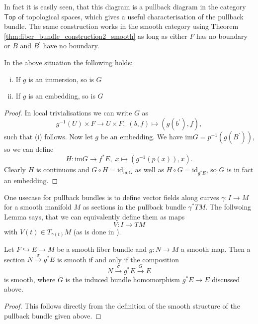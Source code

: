     In fact it is easily seen, that this diagram is a pullback diagram in the category $\mathsf{Top}$ of topological spaces, which gives a useful characterisation of the pullback bundle. The same construction works in the smooth category using Theorem \ref{thm:fiber_bundle_construction2_smooth} as long as either $F$ has no boundary or $B$ and $B^\prime$ have no boundary. 

    \needspace{3cm}
    \begin{lemma}
        \label{fiber_bundles:lem:pullback_of_bundle_under_embedding}
        In the above situation the following holds:
        \begin{enumerate}[(i)]
            \item If $g$ is an immersion, so is $G$
            \item If $g$ is an embedding, so is $G$
        \end{enumerate}
    \end{lemma}
   \begin{proof}
    In local trivialisations we can write $G$ as
    \[
    g^{-1}(U) \times F \to U \times F, \; (b,f) \mapsto (g(b^\prime),f),
    \]
    such that (i) follows. Now let $g$ be an embedding. We have $\mathrm{im} G = p^{-1}(g(B^\prime))$, so we can define 
    \[
    H \colon \mathrm{im} G \to f^*E, \; x \mapsto (g^{-1}(p(x)),x).
    \]
    Clearly $H$ is continuous and $G \circ H = \mathrm{id}_{\mathrm{im} G}$ as well as $H \circ G = \mathrm{id}_{g^*E}$, so $G$ is in fact an embedding.
   \end{proof}



   One usecase for pullback bundles is to define vector fields along curves $\gamma \colon I \to M$ for a smooth manifold $M$ as sections in the pullback bundle $\gamma^\ast TM$. The follwoing Lemma says, that we can equivalently define them as maps 
   \[
   V \colon I \to TM
   \]
   with $V(t) \in T_{\gamma(t)} M$ (as is done in \cite{lee2018riemannian}).

   \begin{lemma}
    Let $F \hookrightarrow E \to M$ be a smooth fiber bundle and $g \colon N \to M$ a smooth map. Then a section $N \xrightarrow{\sigma} g^\ast E$ is smooth if and only if the composition
    \[
    N \xrightarrow{\sigma} g^\ast E \xrightarrow{G} E
    \]
    is smooth, where $G$ is the induced bundle homomorphism $g^\ast E \to E$ discussed above.
   \end{lemma}

   \begin{proof}
    This follows directly from the definition of the smooth structure of the pullback bundle given above.
   \end{proof}
